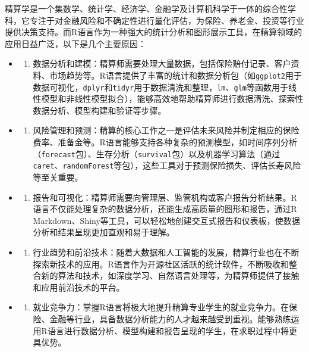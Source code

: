 \documentclass[
]{book}
\providecommand{\tightlist}{%
  \setlength{\itemsep}{0pt}\setlength{\parskip}{0pt}}
\begin{document}
精算学是一个集数学、统计学、经济学、金融学及计算机科学于一体的综合性学科，它专注于对金融风险和不确定性进行量化评估，为保险、养老金、投资等行业提供决策支持。而R语言作为一种强大的统计分析和图形展示工具，在精算领域的应用日益广泛，以下是几个主要原因：

\begin{itemize}
\item
  \begin{enumerate}
  \def\labelenumi{\arabic{enumi}.}
  \tightlist
  \item
    数据分析和建模：精算师需要处理大量数据，包括保险赔付记录、客户资料、市场趋势等。R语言提供了丰富的统计和数据分析包（如\texttt{ggplot2}用于数据可视化，\texttt{dplyr}和\texttt{tidyr}用于数据清洗和整理，\texttt{lm}、\texttt{glm}等函数用于线性模型和非线性模型拟合），能够高效地帮助精算师进行数据清洗、探索性数据分析、模型构建和验证等步骤。
  \end{enumerate}
\item
  \begin{enumerate}
  \def\labelenumi{\arabic{enumi}.}
  \setcounter{enumi}{1}
  \tightlist
  \item
    风险管理和预测：精算的核心工作之一是评估未来风险并制定相应的保险费率、准备金等。R语言能够支持各种复杂的预测模型，如时间序列分析（\texttt{forecast}包）、生存分析（\texttt{survival}包）以及机器学习算法（通过\texttt{caret}、\texttt{randomForest}等包），这些工具对于预测保险损失、评估长寿风险等至关重要。
  \end{enumerate}
\item
  \begin{enumerate}
  \def\labelenumi{\arabic{enumi}.}
  \setcounter{enumi}{2}
  \tightlist
  \item
    报告和可视化：精算师需要向管理层、监管机构或客户报告分析结果。R语言不仅能处理复杂的数据分析，还能生成高质量的图形和报告，通过R Markdown、Shiny等工具，可以轻松地创建交互式报告和仪表板，使数据分析和结果呈现更加直观和易于理解。
  \end{enumerate}
\item
  \begin{enumerate}
  \def\labelenumi{\arabic{enumi}.}
  \setcounter{enumi}{3}
  \tightlist
  \item
    行业趋势和前沿技术：随着大数据和人工智能的发展，精算行业也在不断探索新技术的应用。R语言作为开源社区活跃的统计软件，不断吸收和整合新的算法和技术，如深度学习、自然语言处理等，为精算师提供了接触和应用前沿技术的平台。
  \end{enumerate}
\item
  \begin{enumerate}
  \def\labelenumi{\arabic{enumi}.}
  \setcounter{enumi}{4}
  \tightlist
  \item
    就业竞争力：掌握R语言将极大地提升精算专业学生的就业竞争力。在保险、金融等行业，具备数据分析能力的人才越来越受到重视。能够熟练运用R语言进行数据分析、模型构建和报告呈现的学生，在求职过程中将更具优势。
  \end{enumerate}
\end{itemize}
\end{document}
